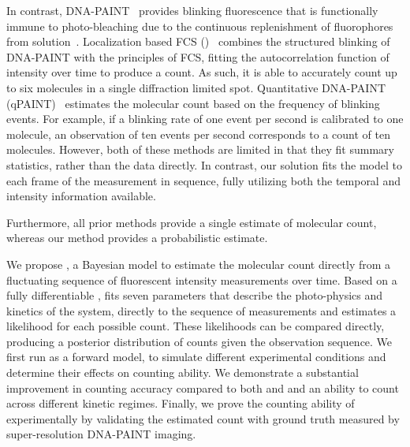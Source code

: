 %
In contrast, DNA-PAINT~\citep{schnitzbauer_2017} provides
blinking fluorescence that is functionally immune to photo-bleaching due to the
continuous replenishment of fluorophores from solution~\citep{stehr_2021}.
  Localization based FCS (\lbfcs)~\citep{stein_2019,stein_2021} combines the
  structured blinking of DNA-PAINT with the principles of FCS, fitting the
  autocorrelation function of intensity over time to produce a count. As such,
  it is able to accurately count up to six molecules in a single diffraction
  limited spot.
  Quantitative DNA-PAINT (qPAINT)~\citep{jungmann_2016} estimates the molecular
  count based on the frequency of blinking events. For example, if a blinking rate of one
  event per second is calibrated to one molecule, an observation of
  ten events per second corresponds to a count of ten molecules.
  However, both of these methods are limited in that they fit summary
  statistics, rather than the data directly.
  In contrast, our solution fits the model to each frame of the measurement 
  in sequence, fully utilizing both the temporal and intensity information available.
  
Furthermore, all prior methods provide a single estimate of molecular count, whereas our 
method provides a probabilistic estimate. 

We propose \ours, a Bayesian model to estimate the molecular count
directly from a fluctuating sequence of fluorescent intensity measurements over
time.
  Based on a fully differentiable \hmm, \ours fits
  seven parameters that describe the photo-physics and kinetics of the system, 
  directly to the sequence of measurements and
  estimates a likelihood for each possible count.
  These likelihoods can be compared directly, producing a posterior
  distribution of counts given the observation sequence.
  We first run \ours as a forward model, to simulate
  different experimental conditions and determine their effects on counting ability.
  We demonstrate a substantial improvement in counting accuracy compared to both \lbfcs and \qpaint
  and an ability to count across different kinetic regimes.
  Finally, we prove the counting ability of \ours experimentally by validating 
  the estimated count with ground truth measured by super-resolution DNA-PAINT imaging.

